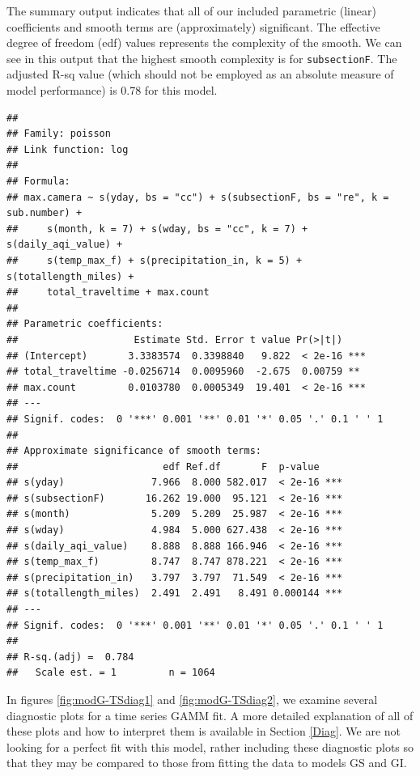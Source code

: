 \documentclass[
]{book}
\newenvironment{Shaded}{\begin{snugshade}}{\end{snugshade}}
\newcommand{\FunctionTok}[1]{\textcolor[rgb]{0.00,0.00,0.00}{#1}}
\newcommand{\NormalTok}[1]{#1}
\newcommand{\SpecialCharTok}[1]{\textcolor[rgb]{0.00,0.00,0.00}{#1}}
\begin{document}
The summary output indicates that all of our included parametric (linear) coefficients and smooth terms are (approximately) significant. The effective degree of freedom (edf) values represents the complexity of the smooth. We can see in this output that the highest smooth complexity is for \texttt{subsectionF}. The adjusted R-sq value (which should not be employed as an absolute measure of model performance) is 0.78 for this model.

\begin{Shaded}
\end{Shaded}

\begin{verbatim}
## 
## Family: poisson 
## Link function: log 
## 
## Formula:
## max.camera ~ s(yday, bs = "cc") + s(subsectionF, bs = "re", k = sub.number) + 
##     s(month, k = 7) + s(wday, bs = "cc", k = 7) + s(daily_aqi_value) + 
##     s(temp_max_f) + s(precipitation_in, k = 5) + s(totallength_miles) + 
##     total_traveltime + max.count
## 
## Parametric coefficients:
##                    Estimate Std. Error t value Pr(>|t|)    
## (Intercept)       3.3383574  0.3398840   9.822  < 2e-16 ***
## total_traveltime -0.0256714  0.0095960  -2.675  0.00759 ** 
## max.count         0.0103780  0.0005349  19.401  < 2e-16 ***
## ---
## Signif. codes:  0 '***' 0.001 '**' 0.01 '*' 0.05 '.' 0.1 ' ' 1
## 
## Approximate significance of smooth terms:
##                         edf Ref.df       F  p-value    
## s(yday)               7.966  8.000 582.017  < 2e-16 ***
## s(subsectionF)       16.262 19.000  95.121  < 2e-16 ***
## s(month)              5.209  5.209  25.987  < 2e-16 ***
## s(wday)               4.984  5.000 627.438  < 2e-16 ***
## s(daily_aqi_value)    8.888  8.888 166.946  < 2e-16 ***
## s(temp_max_f)         8.747  8.747 878.221  < 2e-16 ***
## s(precipitation_in)   3.797  3.797  71.549  < 2e-16 ***
## s(totallength_miles)  2.491  2.491   8.491 0.000144 ***
## ---
## Signif. codes:  0 '***' 0.001 '**' 0.01 '*' 0.05 '.' 0.1 ' ' 1
## 
## R-sq.(adj) =  0.784   
##   Scale est. = 1         n = 1064
\end{verbatim}

In figures \ref{fig:modG-TSdiag1} and \ref{fig:modG-TSdiag2}, we examine several diagnostic plots for a time series GAMM fit. A more detailed explanation of all of these plots and how to interpret them is available in Section \ref{Diag}. We are not looking for a perfect fit with this model, rather including these diagnostic plots so that they may be compared to those from fitting the data to models GS and GI.
\end{document}
